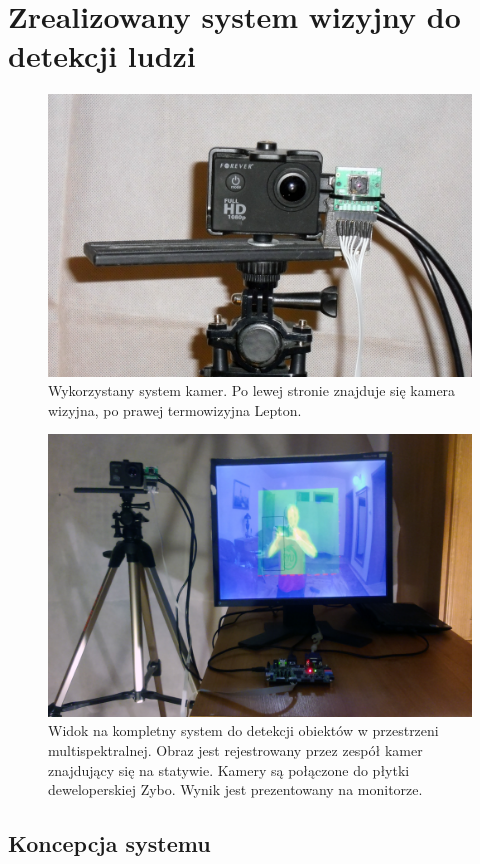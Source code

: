 \chapter{Zrealizowany system wizyjny do detekcji ludzi} %
\label{cha:propSysWiz}

\begin{figure}
\centering
\includegraphics[width=0.65\linewidth]{images/kameraRGBIR.jpg}
\caption[Wykorzystany system kamer.]{Wykorzystany system kamer. Po lewej stronie znajduje się kamera wizyjna, po prawej termowizyjna Lepton.}
\label{fig:kameraRGBIR}
\end{figure}

\begin{figure}
\centering
\includegraphics[width=0.65\linewidth]{images/systemOverview.jpg}
\caption[Widok na kompletny system.]{Widok na kompletny system do detekcji obiektów w przestrzeni multispektralnej. Obraz jest rejestrowany przez zespół kamer znajdujący się na statywie. Kamery są połączone do płytki deweloperskiej Zybo. Wynik jest prezentowany na monitorze.}
\label{fig:systemOverview}
\end{figure}

\section{Koncepcja systemu}

